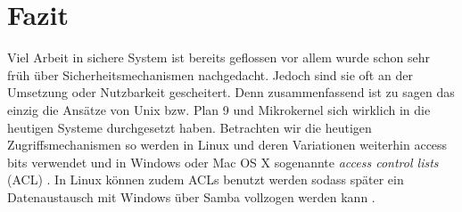\documentclass[german, 9pt,technote]{IEEEtran}
\begin{document}
     
  \section{Fazit}
    Viel Arbeit in sichere System ist bereits geflossen vor allem wurde schon sehr fr\"uh \"uber Sicherheitsmechanismen nachgedacht.
    Jedoch sind sie oft an der Umsetzung oder Nutzbarkeit gescheitert. Denn zusammenfassend ist zu sagen das einzig die Ans\"atze von Unix bzw. Plan
    9 und Mikrokernel sich wirklich in die heutigen Systeme durchgesetzt haben. Betrachten wir die heutigen Zugriffsmechanismen so werden in Linux 
    und deren Variationen weiterhin access bits verwendet und in Windows oder Mac OS X sogenannte \textit{access control lists} (ACL)
    \cite{Url:windows:acl, Url:macosx:acl}.
    In Linux k\"onnen zudem ACLs benutzt werden sodass sp\"ater ein Datenaustausch mit Windows \"uber Samba vollzogen werden kann \cite{Url:linux:acl}.    


\end{document}
